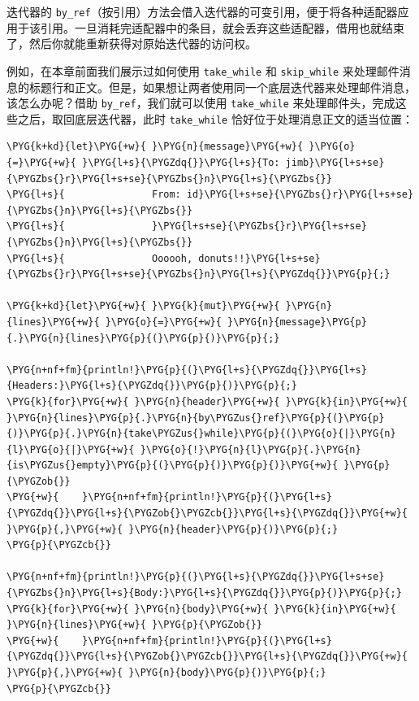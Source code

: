 迭代器的 \texttt{by\_ref}（按引用）方法会借入迭代器的可变引用，便于将各种适配器应用于该引用。一旦消耗完适配器中的条目，就会丢弃这些适配器，借用也就结束了，然后你就能重新获得对原始迭代器的访问权。

例如，在本章前面我们展示过如何使用 \texttt{take\_while} 和 \texttt{skip\_while} 来处理邮件消息的标题行和正文。但是，如果想让两者使用同一个底层迭代器来处理邮件消息，该怎么办呢？借助 \texttt{by\_ref}，我们就可以使用 \texttt{take\_while} 来处理邮件头，完成这些之后，取回底层迭代器，此时 \texttt{take\_while} 恰好位于处理消息正文的适当位置：

\begin{Verbatim}[commandchars=\\\{\},breaklines=true,breakanywhere=true,fontsize=\codefont,xleftmargin=17bp]
\PYG{k+kd}{let}\PYG{+w}{ }\PYG{n}{message}\PYG{+w}{ }\PYG{o}{=}\PYG{+w}{ }\PYG{l+s}{\PYGZdq{}}\PYG{l+s}{To: jimb}\PYG{l+s+se}{\PYGZbs{}r}\PYG{l+s+se}{\PYGZbs{}n}\PYG{l+s}{\PYGZbs{}}
\PYG{l+s}{               From: id}\PYG{l+s+se}{\PYGZbs{}r}\PYG{l+s+se}{\PYGZbs{}n}\PYG{l+s}{\PYGZbs{}}
\PYG{l+s}{               }\PYG{l+s+se}{\PYGZbs{}r}\PYG{l+s+se}{\PYGZbs{}n}\PYG{l+s}{\PYGZbs{}}
\PYG{l+s}{               Oooooh, donuts!!}\PYG{l+s+se}{\PYGZbs{}r}\PYG{l+s+se}{\PYGZbs{}n}\PYG{l+s}{\PYGZdq{}}\PYG{p}{;}

\PYG{k+kd}{let}\PYG{+w}{ }\PYG{k}{mut}\PYG{+w}{ }\PYG{n}{lines}\PYG{+w}{ }\PYG{o}{=}\PYG{+w}{ }\PYG{n}{message}\PYG{p}{.}\PYG{n}{lines}\PYG{p}{(}\PYG{p}{)}\PYG{p}{;}

\PYG{n+nf+fm}{println!}\PYG{p}{(}\PYG{l+s}{\PYGZdq{}}\PYG{l+s}{Headers:}\PYG{l+s}{\PYGZdq{}}\PYG{p}{)}\PYG{p}{;}
\PYG{k}{for}\PYG{+w}{ }\PYG{n}{header}\PYG{+w}{ }\PYG{k}{in}\PYG{+w}{ }\PYG{n}{lines}\PYG{p}{.}\PYG{n}{by\PYGZus{}ref}\PYG{p}{(}\PYG{p}{)}\PYG{p}{.}\PYG{n}{take\PYGZus{}while}\PYG{p}{(}\PYG{o}{|}\PYG{n}{l}\PYG{o}{|}\PYG{+w}{ }\PYG{o}{!}\PYG{n}{l}\PYG{p}{.}\PYG{n}{is\PYGZus{}empty}\PYG{p}{(}\PYG{p}{)}\PYG{p}{)}\PYG{+w}{ }\PYG{p}{\PYGZob{}}
\PYG{+w}{    }\PYG{n+nf+fm}{println!}\PYG{p}{(}\PYG{l+s}{\PYGZdq{}}\PYG{l+s}{\PYGZob{}\PYGZcb{}}\PYG{l+s}{\PYGZdq{}}\PYG{+w}{ }\PYG{p}{,}\PYG{+w}{ }\PYG{n}{header}\PYG{p}{)}\PYG{p}{;}
\PYG{p}{\PYGZcb{}}

\PYG{n+nf+fm}{println!}\PYG{p}{(}\PYG{l+s}{\PYGZdq{}}\PYG{l+s+se}{\PYGZbs{}n}\PYG{l+s}{Body:}\PYG{l+s}{\PYGZdq{}}\PYG{p}{)}\PYG{p}{;}
\PYG{k}{for}\PYG{+w}{ }\PYG{n}{body}\PYG{+w}{ }\PYG{k}{in}\PYG{+w}{ }\PYG{n}{lines}\PYG{+w}{ }\PYG{p}{\PYGZob{}}
\PYG{+w}{    }\PYG{n+nf+fm}{println!}\PYG{p}{(}\PYG{l+s}{\PYGZdq{}}\PYG{l+s}{\PYGZob{}\PYGZcb{}}\PYG{l+s}{\PYGZdq{}}\PYG{+w}{ }\PYG{p}{,}\PYG{+w}{ }\PYG{n}{body}\PYG{p}{)}\PYG{p}{;}
\PYG{p}{\PYGZcb{}}
\end{Verbatim}

